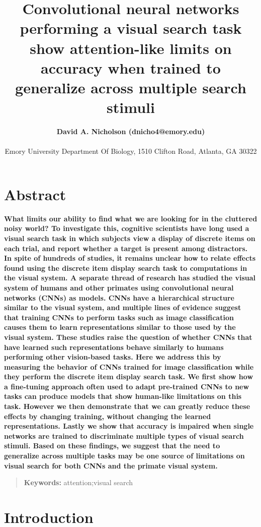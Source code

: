 \documentclass[10pt,letterpaper]{article}
\title{Convolutional neural networks performing a visual search task show attention-like 
limits on accuracy when trained to generalize across multiple search stimuli}
\author{{\large \bf David A. Nicholson (dnicho4@emory.edu)} \\
  \AND {\large \bf Astrid A. Prinz (astrid.prinz@emory.edu)} \\
  Emory University Department Of Biology, 1510 Clifton Road, Atlanta, GA 30322}
\begin{document}
\maketitle

\section{Abstract}
{
\bf
What limits our ability to find what we are looking for in the cluttered noisy world? 
To investigate this, cognitive scientists have long used a 
visual search task in which subjects view a display of discrete items on each trial, 
and report whether a target is present among distractors. 
In spite of hundreds of studies, it remains unclear how to relate 
effects found using the discrete item display search task to computations 
in the visual system. A separate thread of research 
has studied the visual system of humans and other primates using convolutional neural 
networks (CNNs) as models. CNNs have a hierarchical structure similar to 
the visual system, and multiple lines of evidence suggest that training CNNs to 
perform tasks such as image classification causes them to learn  
representations similar to those used by the visual system.
These studies raise the question of whether CNNs that have learned such 
representations behave similarly to humans performing other vision-based tasks. 
Here we address this by measuring the behavior of CNNs trained for image classification 
while they perform the discrete item display search task.
We first show how a fine-tuning approach often used to adapt pre-trained CNNs to new 
tasks can produce models that show human-like limitations on this task. However we 
then demonstrate that we can greatly reduce these effects by changing training,
without changing the learned representations. Lastly we show that accuracy is 
impaired when single networks are trained to discriminate multiple types of visual 
search stimuli. Based on these findings, we suggest that the need to generalize across
multiple tasks may be one source of limitations on visual search for both CNNs and 
the primate visual system.
}
\begin{quote}
\small
\textbf{Keywords:} 
attention;visual search
\end{quote}

\section{Introduction}
\end{document}
